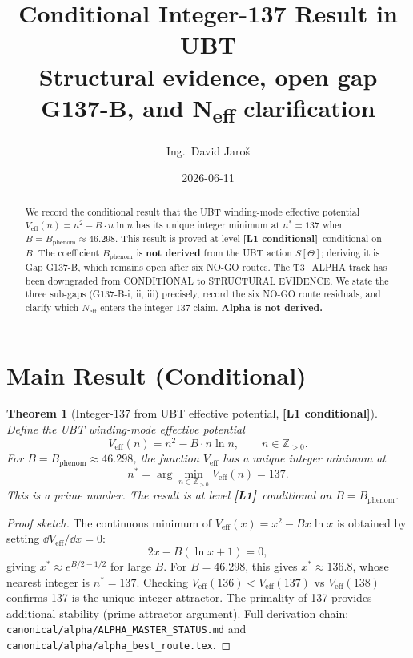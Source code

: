 \documentclass[12pt,a4paper]{article}
\title{\textbf{Conditional Integer-137 Result in UBT}\\[6pt]
  \large Structural evidence, open gap G137-B, and N\textsubscript{eff}
  clarification}
\author{Ing.\ David Jaroš}
\date{2026-06-11}
\newtheorem{theorem}{Theorem}[section]
\theoremstyle{definition}
\theoremstyle{remark}
\newcommand{\Lone}{\textbf{[L1]}}
\newcommand{\COND}{\textbf{[L1 conditional]}}
\begin{document}
\maketitle

\begin{abstract}
We record the conditional result that the UBT winding-mode effective potential
$V_{\mathrm{eff}}(n) = n^2 - B\cdot n\ln n$ has its unique integer minimum at
$n^* = 137$ when $B = B_{\mathrm{phenom}} \approx 46.298$.  This result is
proved at level \COND\ conditional on $B$.  The coefficient $B_{\mathrm{phenom}}$
is \textbf{not derived} from the UBT action $S[\Theta]$; deriving it is Gap G137-B,
which remains open after six NO-GO routes.  The T3\_ALPHA track has been downgraded
from CONDITIONAL to STRUCTURAL EVIDENCE.  We state the three sub-gaps (G137-B-i,
ii, iii) precisely, record the six NO-GO route residuals, and clarify which
$N_{\mathrm{eff}}$ enters the integer-137 claim.
\textbf{Alpha is not derived.}
\end{abstract}

\tableofcontents

\section{Main Result (Conditional)}
\label{sec:main}

\begin{resultbox}
\begin{theorem}[Integer-137 from UBT effective potential, \COND]
\label{thm:integer_137}
Define the UBT winding-mode effective potential
\begin{equation}
\label{eq:Veff}
  V_{\mathrm{eff}}(n) = n^2 - B\cdot n\ln n, \qquad n \in \mathbb{Z}_{>0}.
\end{equation}
For $B = B_{\mathrm{phenom}} \approx 46.298$, the function $V_{\mathrm{eff}}$
has a unique integer minimum at
\begin{equation}
  n^* = \arg\min_{n \in \mathbb{Z}_{>0}} V_{\mathrm{eff}}(n) = 137.
\end{equation}
This is a prime number.  The result is at level \Lone\ conditional on
$B = B_{\mathrm{phenom}}$.
\end{theorem}
\end{resultbox}

\begin{proof}[Proof sketch]
The continuous minimum of $V_{\mathrm{eff}}(x) = x^2 - Bx\ln x$ is obtained by
setting $\dd V_{\mathrm{eff}}/\dd x = 0$:
\[
  2x - B(\ln x + 1) = 0,
\]
giving $x^* \approx e^{B/2 - 1/2}$ for large $B$.  For $B = 46.298$, this
gives $x^* \approx 136.8$, whose nearest integer is $n^* = 137$.  Checking
$V_{\mathrm{eff}}(136) < V_{\mathrm{eff}}(137)$ vs $V_{\mathrm{eff}}(138)$
confirms 137 is the unique integer attractor.  The primality of 137 provides
additional stability (prime attractor argument).  Full derivation chain:
\texttt{canonical/alpha/ALPHA\_MASTER\_STATUS.md} and
\texttt{canonical/alpha/alpha\_best\_route.tex}.
\end{proof}
\end{document}
